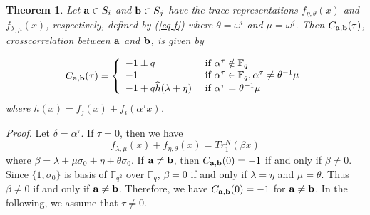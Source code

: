 \documentclass{article}
\newtheorem{theorem}{Theorem}
\newcommand{\F}{\ensuremath{\mathbb F}}
\newcommand{\abu}{{\bf{a}}}
\newcommand{\bbu}{{\bf{b}}}
\begin{document}
\begin{theorem} \label{th-bent}  Let $\abu\in S_i$ and $\bbu\in S_j$ have the trace representations $f_{\eta, \theta}(x)$ and  $f_{\lambda, \mu}(x)$, respectively, defined by  (\ref{eq-f}) where $\theta=\omega^i$ and  $\mu=\omega^j$.   Then $C_{\abu, \bbu}(\tau)$, crosscorrelation between $\abu$ and
$\bbu$, is given by


\[
C_{\abu, \bbu}(\tau)=\left \{ \begin{array}{ll}
-1\pm q & \mbox{ if } \alpha^{ \tau} \notin \F_q\\
-1 & \mbox{ if }  \alpha^{\tau} \in \F_q,  \alpha^{\tau} \not = \theta^{-1}\mu\\
-1+q \widehat{h}(\lambda + \eta)  & \mbox{ if }   \alpha^{\tau}   = \theta^{-1}\mu
 \end{array}\right.
 \]
 where 
$
h(x)=f_{j}(x)+f_{i}(\alpha^{\tau}x)$.
 \end{theorem}

{\em Proof.}   Let $\delta =\alpha^{\tau}$. If $\tau=0$, then we
have
\[
f_{\lambda, \mu}(x) + f_{\eta, \theta}( x) = Tr_1^N(\beta x)
\]
where $\beta =\lambda + \mu\sigma_0 +\eta+\theta \sigma_0$. If
$\abu\ne \bbu$, then $C_{\abu, \bbu}(0)=-1$ if and only if $\beta
\ne 0$. Since $\{1, \sigma_0\}$ is basis of $\F_{q^2}$ over
$\F_q$, $\beta=0$ if and only if $\lambda =\eta$ and $\mu=\theta$.
Thus $\beta\ne 0$ if and only if $\abu\ne \bbu$. Therefore, we
have $C_{\abu, \bbu}(0)=-1$ for $\abu\ne \bbu$. In the following,
we assume that $\tau \ne 0$.
\end{document}
